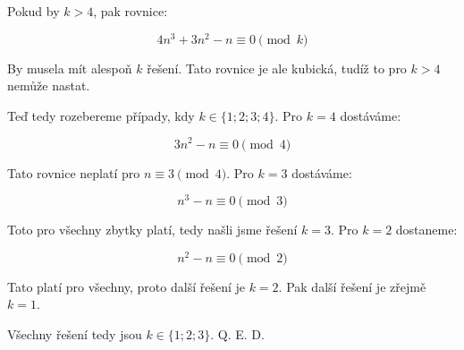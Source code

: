 \documentclass{fkssolpub}
\author{Ondřej Sedláček}
\begin{document}
Pokud by $k > 4$, pak rovnice:

\[
	4n^3 + 3n^2 - n \equiv 0 \pmod{k}
\]

By musela mít alespoň $k$ řešení. Tato rovnice je ale kubická, tudíž to pro $k > 4$ nemůže nastat.

Teď tedy rozebereme případy, kdy $k \in \{1;2;3;4\}$. Pro $k = 4$ dostáváme:

\[
	3n^2 - n \equiv 0 \pmod{4}
\]

Tato rovnice neplatí pro $n \equiv 3 \pmod{4}$. Pro $k = 3$ dostáváme:

\[
	n^3 - n \equiv 0 \pmod{3}
\]

Toto pro všechny zbytky platí, tedy našli jsme řešení $k = 3$. Pro $k = 2$ dostaneme:

\[
	n^2 - n \equiv 0 \pmod{2}
\]

Tato platí pro všechny, proto další řešení je $k = 2$. Pak další řešení je zřejmě $k = 1$.

Všechny řešení tedy jsou $k \in \{1;2;3\}$. Q. E. D.
\end{document}
